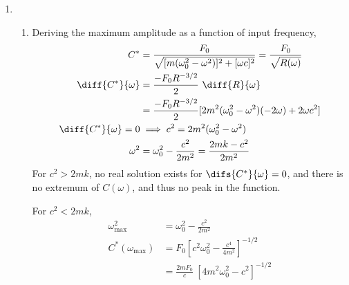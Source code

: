 \begin{enumerate}
    \item
          \begin{enumerate}
              \item Deriving the maximum amplitude as a function of input frequency,
                    \begin{align}
                        C^{*}                    & = \frac{F_{0}}
                        {\sqrt{[m(\omega_{0}^{2}
                                - \omega^{2})]^{2} + [\omega c]^{2}}}
                        = \frac{F_{0}}{\sqrt{R(\omega)}}                      \\
                        \diff {C^{*}}{\omega}    & = \frac{-F_{0}R^{-3/2}}{2}
                        \ \diff {R}{\omega}                                   \\
                                                 & = \frac{-F_{0}R^{-3/2}}{2}
                        [2m^{2}(\omega_{0}^{2}
                        - \omega^{2})(-2\omega) + 2\omega c^{2}]              \\
                        \diff{C^{*}}{\omega} = 0 & \implies c^{2} = 2m^{2}
                        (\omega_{0}^{2} - \omega^{2})                         \\
                        \omega^{2}               & = \omega_{0}^{2}
                        - \frac{c^{2}}{2m^{2}} = \frac{2mk - c^{2}}{2m^{2}}   \\
                    \end{align}
                    For $ c^{2} > 2mk $, no real solution exists for $ \difs {C^{*}}
                        {\omega} = 0$, and there is no extremum of $ C(\omega) $, and thus
                    no peak in the function. \par
                    For $ c^{2} < 2mk $,
                    \begin{align}
                        \omega_{\text{max}}^{2}    & = \omega_{0}^{2} -
                        \frac{c^{2}}{2m^{2}}                                \\
                        C^{*}(\omega_{\text{max}}) & = F_{0}\left[ c^{2}
                        \omega_{0}^{2} - \frac{c^{4}}{4m^{2}}\right]^{-1/2} \\
                                                   & = \frac{2mF_{0}}{c}
                        \ [4m^{2}\omega_{0}^{2} - c^{2}]^{-1/2}
                    \end{align}


\end{enumerate}
\end{enumerate}
